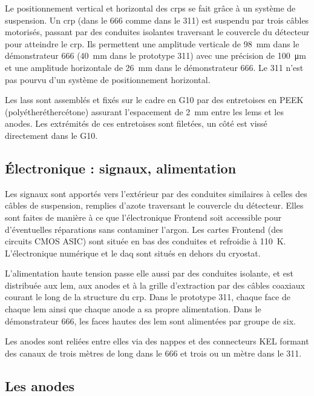             Le positionnement vertical et horizontal des \glspl{crp} se fait grâce à un système de suspension. Un \gls{crp} (dans le 666 comme dans le 311) est suspendu par trois câbles motorisés, passant par des conduites isolantes traversant le couvercle du détecteur pour atteindre le \gls{crp}. Ils permettent une amplitude verticale de \SI{98}{\milli\meter} dans le démonstrateur 666 (\SI{40}{\milli\meter} dans le prototype 311) avec une précision de \SI{100}{\micro\meter} et une amplitude horizontale de \SI{26}{\milli\meter} dans le démonstrateur 666. Le 311 n'est pas pourvu d'un système de positionnement horizontal.
            
            Les \glspl{las} sont assemblés et fixés sur le cadre en G10 par des entretoises en PEEK (polyétheréthercétone) assurant l'espacement de \SI{2}{\milli\meter} entre les \glspl{lem} et les anodes. Les extrémités de ces entretoises sont filetées, un côté est vissé directement dans le G10.
            
        \subsection{Électronique : signaux, alimentation}
            
            Les signaux sont apportés vers l'extérieur par des conduites similaires à celles des câbles de suspension, remplies d'azote \cite{dune_chap4} traversant le couvercle du détecteur. Elles sont faites de manière à ce que l'électronique Frontend soit accessible pour d'éventuelles réparations sans contaminer l'argon. Les cartes Frontend (des circuits CMOS ASIC) sont située en bas des conduites et refroidie à \SI{110}{\kelvin}. L'électronique numérique et le \gls{daq} sont situés en dehors du cryostat.
            
            L'alimentation haute tension passe elle aussi par des conduites isolante, et est distribuée aux \gls{lem}, aux anodes et à la grille d'extraction par des câbles coaxiaux courant le long de la structure du \gls{crp}. Dans le prototype 311, chaque face de chaque \gls{lem} ainsi que chaque anode a sa propre alimentation. Dans le démonstrateur 666, les faces hautes des \gls{lem} sont alimentées par groupe de six.
            
            Les anodes sont reliées entre elles via des nappes et des connecteurs KEL formant des canaux de trois mètres de long dans le 666 et trois ou un mètre dans le 311.
            
        \subsection{Les anodes}\label{sec::anode}
        
